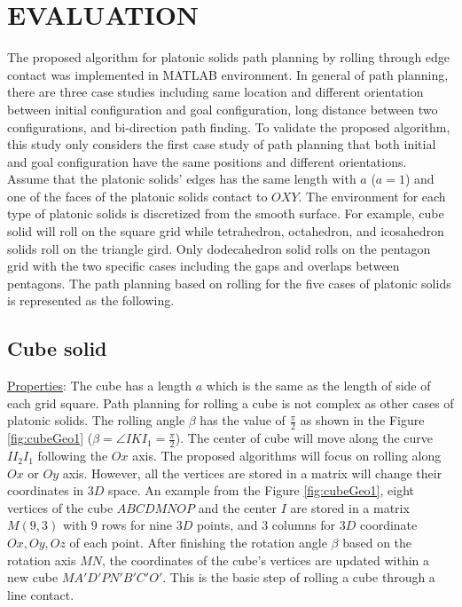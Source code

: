 \section{EVALUATION}
\label{sec:eva}
The proposed algorithm for platonic solids path planning by rolling through edge contact was implemented in MATLAB environment. 
In general of path planning, there are three case studies including same location and different orientation between initial configuration and goal configuration, long distance between two configurations, and bi-direction path finding. 
To validate the proposed algorithm, this study only considers the first case study of path planning that both initial and goal configuration have the same positions and different orientations.\\  

\noindent Assume that the platonic solids' edges has the same length with $a$ ($a=1$) and one of the faces of the platonic solids contact to $OXY$. 
The environment for each type of platonic solids is discretized from the smooth surface. 
For example, cube solid will roll on the square grid while tetrahedron, octahedron, and icosahedron solids roll on the triangle gird. 
Only dodecahedron solid rolls on the pentagon grid with the two specific cases including the gaps and overlaps between pentagons. 
The path planning based on rolling for the five cases of platonic solids is represented as the following. 

\subsection{Cube solid}
\noindent\uline{Properties}:
The cube has a length $a$ which is the same as the length of side of each grid square.
Path planning for rolling a cube is not complex as other cases of platonic solids. 
The rolling angle $\beta$ has the value of $\frac{\pi}{2}$ as shown in the Figure \ref{fig:cubeGeo1} ($\beta=\angle{IKI_1}=\frac{\pi}{2}$). 
The center of cube will move along the curve $II_2I_1$ following the $Ox$ axis. 
The proposed algorithms will focus on rolling along $Ox$ or $Oy$ axis. 
However, all the vertices are stored in a matrix will change their coordinates in $3D$ space. 
An example from the Figure \ref{fig:cubeGeo1}, eight vertices of the cube $ABCDMNOP$ and the center $I$ are stored in a matrix $M(9,3)$ with $9$ rows for nine $3D$ points, and $3$ columns for $3D$ coordinate $Ox,Oy,Oz$ of each point. 
After finishing the rotation angle $\beta$ based on the rotation axis $MN$, the coordinates of the cube's vertices are updated within a new cube $MA'D'PN'B'C'O'$. 
This is the basic step of rolling a cube through a line contact.

